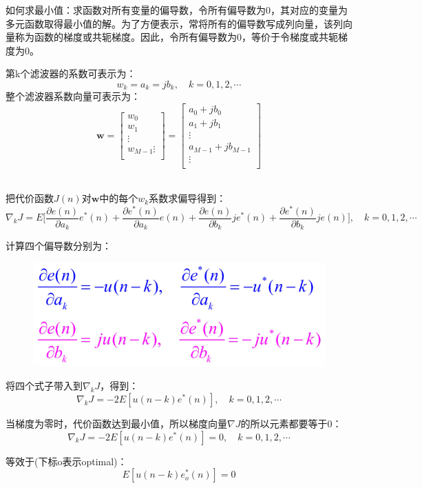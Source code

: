 \documentclass[UTF8]{ctexart} %
\begin{document}
			如何求最小值：求函数对所有变量的偏导数，令所有偏导数为0，其对应的变量为多元函数取得最⼩值的解。为了⽅便表示，常将所有的偏导数写成列向量，该列向量称为函数的梯度或共轭梯度。因此，令所有偏导数为0，等价于令梯度或共轭梯度为0。
			
			第k个滤波器的系数可表示为：
			\[w_k = a_k=jb_k,\quad k=0,1,2,\cdots \]
			整个滤波器系数向量可表示为：
			\[\textbf{w} = \begin{bmatrix}
			w_0\\
			w_1\\
			\vdots\\
			w_{M-1}
			\vdots\\
			\end{bmatrix} =
			\begin{bmatrix}
			a_0+jb_0\\
			a_1+jb_1\\
			\vdots\\
			a_{M-1}+jb_{M-1}\\
			\vdots\\
			\end{bmatrix}\]\
			
			把代价函数$J(n)$对$\textbf{w}$中的每个$w_k$系数求偏导得到：
			\[\nabla_kJ = E\Bigg[\frac{\partial e(n)}{\partial a_k}e^*(n) +\frac{\partial e^*(n)}{\partial a_k}e(n)     + \frac{\partial e(n)}{\partial b_k}je^*(n) + \frac{\partial e^*(n)}{\partial b_k}je(n)\Bigg],\quad k=0,1,2,\cdots\]
			
			计算四个偏导数分别为：
			\begin{figure}[H]
				\centering\includegraphics[scale=0.3]{10.png}
			\end{figure}
			
			将四个式子带入到$\nabla_kJ$，得到：
			\[\nabla_kJ = -2E[u(n-k)e^*(n)],\quad k=0,1,2,\cdots\]
			
			当梯度为零时，代价函数达到最小值，所以梯度向量$\nabla J$的所以元素都要等于0：
			\[\nabla_k J =-2E[u(n-k)e^*(n)] = 0 ,\quad k=0,1,2,\cdots\]
			
			等效于(下标o表示optimal)：
			\[E[u(n-k)e_o^*(n)] = 0\]
			
\end{document}
